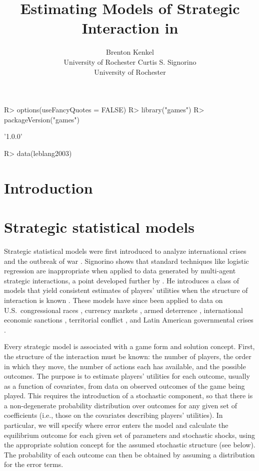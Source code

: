 \documentclass[article]{jss}
\author{Brenton Kenkel\\University of Rochester \And
  Curtis S. Signorino\\University of Rochester}
\title{Estimating Models of Strategic Interaction in \proglang{R}}
\begin{document}
\maketitle

\begin{Schunk}
\begin{Sinput}
R> options(useFancyQuotes = FALSE)
R> library("games")
R> packageVersion("games")
\end{Sinput}
\begin{Soutput}
[1] '1.0.0'
\end{Soutput}
\begin{Sinput}
R> data(leblang2003)
\end{Sinput}
\end{Schunk}

\section{Introduction}

 \citep{Rlang}

\section{Strategic statistical models}
\label{sec:models}

Strategic statistical models were first introduced to analyze international
crises and the outbreak of war \citep{Signorino1999}.  Signorino shows that
standard techniques like logistic regression are inappropriate when applied to
data generated by multi-agent strategic interactions, a point developed further
by \citet{Signorino2003a}.  He introduces a class of models that yield
consistent estimates of players' utilities when the structure of interaction is
known \citep[see also][]{Signorino2003}.  These models have since been applied
to data on U.S.\ congressional races \citep{Carson2003,Carson2005}, currency
markets \citep{Leblang2003}, armed deterrence \citep{Signorino2006},
international economic sanctions \citep{McLean2010}, territorial conflict
\citep{Carter2010a}, and Latin American governmental crises \citep{Helmke2010}.

Every strategic model is associated with a game form and solution concept.
First, the structure of the interaction must be known: the number of players,
the order in which they move, the number of actions each has available, and the
possible outcomes.  The purpose is to estimate players' utilities for each
outcome, usually as a function of covariates, from data on observed outcomes of
the game being played.  This requires the introduction of a stochastic
component, so that there is a non-degenerate probability distribution over
outcomes for any given set of coefficients (i.e., those on the covariates
describing players' utilities).  In particular, we will specify where error
enters the model and calculate the equilibrium outcome for each given set of
parameters and stochastic shocks, using the appropriate solution concept for the
assumed stochastic structure (see below).  The probability of each outcome can
then be obtained by assuming a distribution for the error terms.
\end{document}
